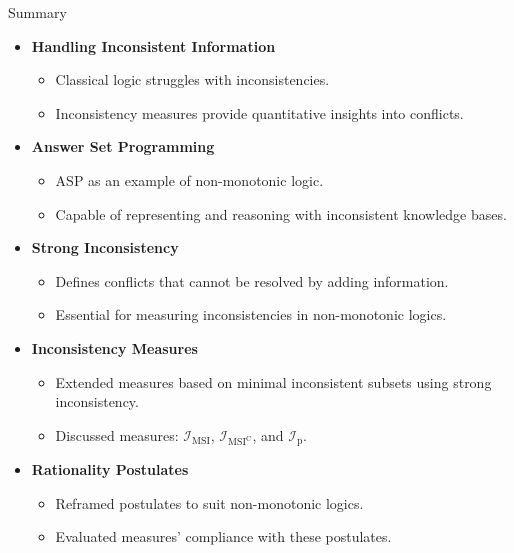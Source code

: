 \begin{frame}{Summary}
    \begin{itemize}
        \item \textbf{Handling Inconsistent Information}
              \begin{itemize}
                  \item Classical logic struggles with inconsistencies.
                  \item Inconsistency measures provide quantitative insights into conflicts.
              \end{itemize}
        \item \textbf{Answer Set Programming}
              \begin{itemize}
                  \item ASP as an example of non-monotonic logic.
                  \item Capable of representing and reasoning with inconsistent knowledge bases.
              \end{itemize}
        \item \textbf{Strong Inconsistency}
              \begin{itemize}
                  \item Defines conflicts that cannot be resolved by adding information.
                  \item Essential for measuring inconsistencies in non-monotonic logics.
              \end{itemize}
        \item \textbf{Inconsistency Measures}
              \begin{itemize}
                  \item Extended measures based on minimal inconsistent subsets using strong inconsistency.
                  \item Discussed measures: $\mathcal{I}_{\text{MSI}}$, $\mathcal{I}_{\text{MSI}^\text{C}}$, and $\mathcal{I}_{\text{p}}$.
              \end{itemize}
        \item \textbf{Rationality Postulates}
              \begin{itemize}
                  \item Reframed postulates to suit non-monotonic logics.
                  \item Evaluated measures' compliance with these postulates.
              \end{itemize}
    \end{itemize}
\end{frame}

